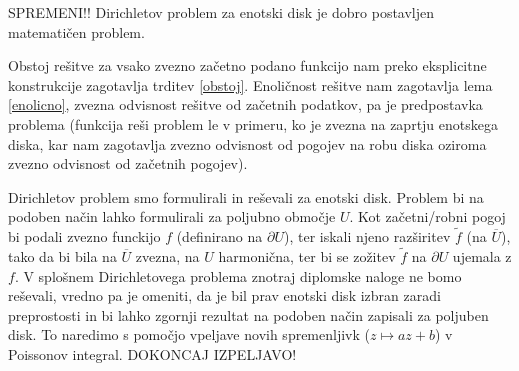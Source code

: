 \documentclass[mat1]{fmfdelo}
\begin{document}
    \begin{posledica}
        SPREMENI!!
        Dirichletov problem za enotski disk je dobro postavljen matematičen problem. 
    \end{posledica}
    \begin{dokaz}
        Obstoj rešitve za vsako zvezno začetno podano funkcijo nam preko eksplicitne konstrukcije zagotavlja trditev \ref{obstoj}. 
        Enoličnost rešitve nam zagotavlja lema \ref{enolicno}, zvezna odvisnost rešitve od začetnih podatkov, pa je predpostavka problema (funkcija reši problem le v primeru, ko je zvezna na zaprtju enotskega diska, kar nam zagotavlja zvezno odvisnost od pogojev na robu diska oziroma zvezno odvisnost od začetnih pogojev).
    \end{dokaz}

    \begin{opomba}
        \label{alldisk}
        Dirichletov problem smo formulirali in reševali za enotski disk. Problem bi na podoben način lahko formulirali za poljubno območje $U$. 
        Kot začetni/robni pogoj bi podali zvezno funckijo $f$ (definirano na $\partial U$), ter iskali njeno razširitev $\widetilde{f}$ (na $\overline{U}$), tako da bi bila na $\overline{U}$ zvezna, 
        na $U$ harmonična, ter bi se zožitev $\widetilde{f}$ na $\partial U$ ujemala z $f$.
        V splošnem Dirichletovega problema znotraj diplomske naloge ne bomo reševali, vredno pa je omeniti, 
        da je bil prav enotski disk izbran zaradi preprostosti in bi lahko zgornji rezultat na podoben način zapisali za poljuben disk. To naredimo s pomočjo vpeljave novih spremenljivk ($z \mapsto az + b$) v Poissonov integral. 
        DOKONCAJ IZPELJAVO!
     \end{opomba}
\end{document}
